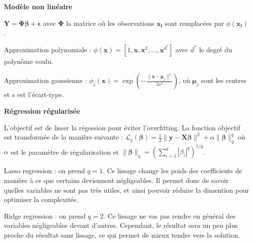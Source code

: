 \documentclass[5pt,a4paper]{article}
\begin{document}
\textbf{Modèle non linéaire}

$\mathbf{Y} = \boldsymbol{\Phi} \boldsymbol{\beta} + \boldsymbol{\epsilon}$ avec $\boldsymbol{\Phi}$ la matrice où les observations $\mathbf{x_i}$ sont remplacées par $\phi (\mathbf{x_i})$.

Approximation polynomiale : $\phi(\mathbf{x}) = [1, \mathbf{x}, \mathbf{x}^2, \ldots, \mathbf{x}^{d^{*}}]$ avec $d^*$ le degré du polynôme voulu.

Approximation gaussienne : $\phi_j(\mathbf{x}) = \exp\left(-\frac{\|\mathbf{x} - \boldsymbol{\mu}_j\|^2}{2s^2}\right)$, où $\boldsymbol{\mu}_j$ sont les centres et $s$ est l'écart-type.

\textbf{Régression régularisée}

L'objectif est de lisser la régession pour éviter l'overfitting. La fonction objectif est transformée de la manière suivante : $\mathcal{L}_q(\boldsymbol{\beta}) = \frac{1}{2}\|\mathbf{y} - \mathbf{X} \boldsymbol{\beta}\|^{2} + \alpha \|\boldsymbol{\beta}\|_{q}^{q}$ où $\alpha$ est le paramètre de régularisation et $\|\boldsymbol{\beta}\|_{q} = \left(\sum_{i=1}^{d} |\beta_i|^{q}\right)^{1/q}$.

Lasso regression : on prend $q=1$. Ce lissage change les poids des coefficients de manière à ce que certains deviennent négligeables. Il permet donc de savoir quelles variables ne sont pas très utiles, et ainsi pouvoir réduire la dimention pour optimiser la complexitée.

Ridge regression : on prend $q=2$. Ce lissage ne vas pas rendre en général des variables négligeables devant d'autres. Cependant, le résultat sera un peu plus proche du résultat sans lissage, ce qui permet de mieux tendre vers la solution.
\end{document}
